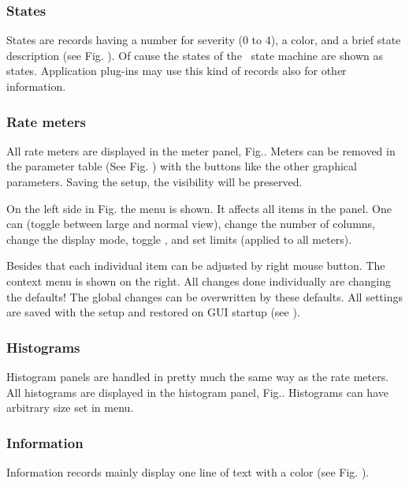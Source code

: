 \subsubsection{States}
States are records having a number for severity (0 to 4), a color,
and a brief state description (see Fig. ).
Of cause the states of the \dabc\ state machine are shown as states.
Application plug-ins may use this kind of records also for other
information.

\subsubsection{Rate meters}
All rate meters are displayed in the meter panel, Fig.. 
Meters can be removed
in the parameter table (See Fig. ) 
with the  buttons like the other graphical parameters.
Saving the setup, the visibility will be preserved.

On the left side in Fig.  the 
menu is shown. It affects all items in the panel. One can 
(toggle between large and normal view), change the number of
columns, change the display mode, toggle , and set limits
(applied to all meters). 

Besides that each individual item can be
adjusted by right mouse button. The context menu is shown on the right.
All changes done individually are changing the defaults!
The global changes can be overwritten by these defaults.
All settings are saved with the setup and restored on GUI startup
(see ).

\subsubsection{Histograms}
Histogram panels are handled in pretty much the same way as the rate meters.
All histograms are displayed in the histogram panel, Fig.. 
Histograms can have arbitrary size set in  menu.

\subsubsection{Information}
Information records mainly display one line of text with a color
(see Fig. ).

